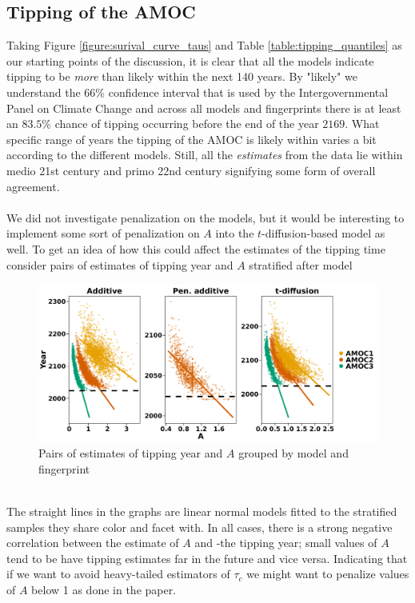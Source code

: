 \subsection{Tipping of the AMOC}
Taking Figure \ref{figure:surival_curve_taus} and Table \ref{table:tipping_quantiles} as our starting points of the discussion, it is clear that all the models indicate tipping to be \textit{more} than likely within the next 140 years. By "likely" we understand the 66\% confidence interval that is used by the Intergovernmental Panel on Climate Change \cite{Ditlevsen2023} and across all models and fingerprints there is at least an $83.5\%$ chance of tipping occurring before the end of the year $2169$. What specific range of years the tipping of the AMOC is likely within varies a bit according to the different models. Still, all the \textit{estimates} from the data lie within medio 21st century and primo 22nd century signifying some form of overall agreement.\\\\
We did not investigate penalization on the models, but it would be interesting to implement some sort of penalization on $A$ into the $t$-diffusion-based model as well. To get an idea of how this could affect the estimates of the tipping time consider pairs of estimates of tipping year and $A$ stratified after model
\begin{figure}[h!]
    \begin{center}
    \includegraphics[scale = .082]{figures/correlation_between_A_and_tau_plot.jpeg}
    \caption{Pairs of estimates of tipping year and $A$ grouped by model and fingerprint}
    \label{figure:correlation_A_and_tau}
\end{center}
\end{figure}\\
The straight lines in the graphs are linear normal models fitted to the stratified samples they share color and facet with. In all cases, there is a strong negative correlation between the estimate of $A$ and -the tipping year; small values of $A$ tend to be have tipping estimates far in the future and vice versa. Indicating that if we want to avoid heavy-tailed estimators of $\tau_c$ we might want to penalize values of $A$ below 1 as done in the paper.

